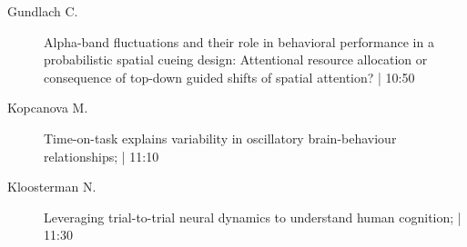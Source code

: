 \begin{symposium}
\begin{description}
                \item [ Gundlach C.] Alpha-band fluctuations and their role in behavioral performance in a probabilistic spatial cueing design: Attentional resource allocation or consequence of top-down guided shifts of spatial attention? \textcolor{mygray}{ | 10:50}    
                
                \item [ Kopcanova M.] Time-on-task explains variability in oscillatory brain-behaviour relationships; \textcolor{mygray}{ | 11:10}    
                
                \item [ Kloosterman N.] Leveraging trial-to-trial neural dynamics to understand human cognition; \textcolor{mygray}{ | 11:30}    
                
            \end{description} 
            \end{symposium}
            